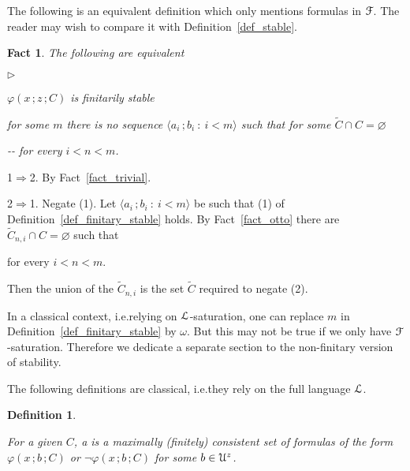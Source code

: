 \documentclass{amsproc}
\makeatletter
\newcommand{\mylabel}[1]{{#1}\hfill}
\renewenvironment{itemize}
  {\begin{list}{$\triangleright$}{%
  \setlength{\parskip}{0mm}
  \setlength{\topsep}{.1\baselineskip}
  \setlength{\rightmargin}{0mm}
  \setlength{\listparindent}{0mm}
  \setlength{\itemindent}{0mm}
  \setlength{\labelwidth}{3ex}
  \setlength{\itemsep}{.1\baselineskip}
  \setlength{\parsep}{.1\baselineskip}
  \setlength{\partopsep}{0mm}
  \setlength{\labelsep}{1ex}
  \setlength{\leftmargin}{\labelwidth+\labelsep}
  \let\makelabel\mylabel}}{%
\end{list}}
\newcounter{thm}
\theoremstyle{mio}
\newtheorem{fact}[thm]{Fact}\tcolorboxenvironment{fact}{mythm}
\newtheorem{definition}[thm]{Definition}\tcolorboxenvironment{definition}{mythm}
\providecommand{\proofNameStyle}{\bfseries}
\renewenvironment{proof}[1][\proofname]{\par
  \pushQED{\qed}%
  \normalfont%
  \trivlist
  \item[\hskip\labelsep
        \proofNameStyle
    #1\@addpunct{.}]\ignorespaces
}{%
  \popQED\endtrivlist\@endpefalse
}
\renewcommand*{\emph}[1]{%
   \smash{\tikz[baseline]\node[rectangle, fill=teal!25, rounded corners, inner xsep=0.5ex, inner ysep=0.2ex, anchor=base, minimum height = 2.7ex]{\strut #1};}}
\makeatother
\begin{document}
The following is an equivalent definition which only mentions formulas in ${\EuScript F}$.
The reader may wish to compare it with Definition~\ref{def_stable}.

\begin{fact}\label{fact_stability_semicalssic}
  The following are equivalent
  \begin{itemize}
    \item [1.]  $\varphi(x\,;z\,;C)$ is finitarily stable
    \item [2.]  for some $m$ there is no sequence $\langle a_i\,;b_i\ :\ i<m\rangle$ such that for some $\tilde C\cap C=\varnothing$\smallskip
    
    \noindent\kern-\kern-
    \hfill for every $i<n<m$.
  \end{itemize}
\end{fact}

\begin{proof}
  1$\Rightarrow$2.
  By Fact~\ref{fact_trivial}.

  2$\Rightarrow$1.
  Negate (1).
  Let $\langle a_i\,;b_i\ :\ i<m\rangle$ be such that (1) of Definition~\ref{def_finitary_stable} holds.
  By Fact~\ref{fact_otto} there are $\tilde C_{n,i}\cap C=\varnothing$ such that 

  \hfill for every $i<n<m$.

  Then the union of the $\tilde C_{n,i}$ is the set $\tilde C$ required to negate (2).
\end{proof}

In a classical context, i.e.\@ relying on ${\EuScript L}$-saturation, one can replace $m$ in Definition~\ref{def_finitary_stable} by $\omega$.
But this may not be true if we only have ${\EuScript F}$-saturation.
Therefore we dedicate a separate section to the non-finitary version of stability.

The following definitions are classical, i.e.\@ they rely on the full language ${\EuScript L}$.

\begin{definition}\label{def_globaltype}\strut
  For a given $C$, a \emph{global $\varphi(x\,;z\,;C)$-type\/} is a maximally (finitely) consistent set of formulas of the form $\varphi(x\,;b\,;C)$ or $\neg\varphi(x\,;b\,;C)$ for some $b\in{\EuScript U}^{z}$.
\end{definition}
\end{document}
